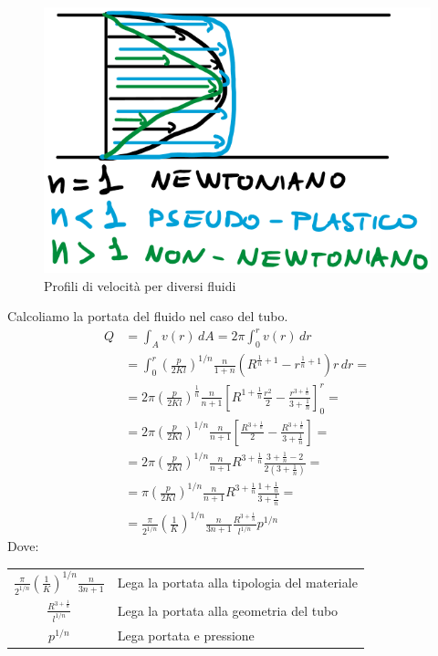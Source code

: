 \begin{figure}
\centering
\includegraphics[width = \textwidth]{gfx/SpeedProfile}
\caption{Profili di velocità per diversi fluidi}
\label{fig:SpeedProfile}
\end{figure}

Calcoliamo la portata del fluido nel caso del tubo.
\begin{equation}
\begin{split}
Q &= \int_A{v(r)\,dA} = 2\pi \int_0^r{v(r)\,dr}\\
&= \int_0^r{\left(\frac{p}{2Kl}\right)^{1/n} \frac{n}{1+n} \left(R^{\frac{1}{n}+1} - r^{\frac{1}{n}+1}\right) r\,dr}=\\
&= 2\pi \left(\frac{p}{2Kl}\right)^{\frac{1}{n}}\frac{n}{n+1}\left[R^{1+\frac{1}{n}}\frac{r^2}{2} - \frac{r^{3+\frac{1}{n}}}{3 + \frac{1}{n}}\right]_0^r=\\
&= 2\pi \left(\frac{p}{2Kl}\right)^{1/n}\frac{n}{n+1}\left[\frac{R^{3+\frac{1}{n}}}{2} - \frac{R^{3+\frac{1}{n}}}{3+\frac{1}{n}}\right]=\\
&= 2\pi \left(\frac{p}{2Kl}\right)^{1/n}\frac{n}{n+1} R^{3+\frac{1}{n}} \frac{3+\frac{1}{n} -2}{2\left(3+\frac{1}{n}\right)} =\\
&=\pi \left(\frac{p}{2Kl}\right)^{1/n} \frac{n}{n+1} R^{3+\frac{1}{n}} \frac{1+\frac{1}{n}}{3+\frac{1}{n}} =\\
&=\frac{\pi}{2^{1/n}} \left(\frac{1}{K}\right)^{1/n} \frac{n}{3n+1} \frac{R^{3+\frac{1}{n}}}{l^{1/n}} p^{1/n}
\end{split}
\end{equation}
Dove:\\
\begin{tabular}{cp{}}
$\frac{\pi}{2^{1/n}} \left(\frac{1}{K}\right)^{1/n} \frac{n}{3n+1}$ & Lega la portata alla tipologia del materiale\\
$ \frac{R^{3+\frac{1}{n}}}{l^{1/n}}$ & Lega la portata alla geometria del tubo\\
$p^{1/n}$ & Lega portata e pressione
\end{tabular}

